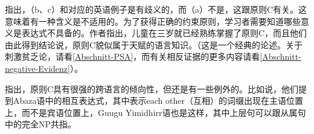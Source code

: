  \citet*[]{CTK2009a} 指出，（b、c）和对应的英语例子是有歧义的，而（a）不是，这跟原则C有关。这意味着有一种含义是不适用的。为了获得正确的约束原则，学习者需要知道哪些意义是表达式不具备的。作者指出，儿童在三岁就已经熟练掌握了原则C，而且他们由此得到结论说，原则C貌似属于天赋的语言知识。（这是一个经典的论述。关于刺激贫乏论，请看\ref{Abschnitt-PSA}，而有关相反证据的更多内容请看\ref{Abschnitt-negative-Evidenz}）。

 \citet[]{EL2009b}指出，原则C具有很强的跨语言的倾向性，但还是有一些例外的。比如说，他们提到Abaza语中的相互表达式，其中表示each other（互相）的词缀出现在主语位置上，而不是宾语位置上，Guugu Yimidhirr语也是这样，其中上层句可以跟从属句中的完全NP共指。

